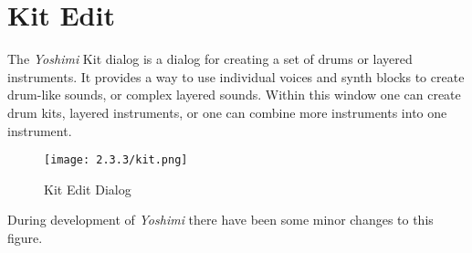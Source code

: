 %
%
%

\section{Kit Edit}
\label{sec:kit_edit}

   The \textsl{Yoshimi} Kit dialog is a dialog for creating a
   set of drums or layered instruments.
   It provides a way to use individual voices and synth blocks to create
   drum-like sounds, or complex layered sounds.
   Within this window one can create drum kits, layered instruments, or one
   can combine more instruments into one instrument.

\begin{figure}[H]
   \centering
   \texttt{[image: 2.3.3/kit.png]}
   \caption{Kit Edit Dialog}
   \label{fig:kit_edit_dialog}
\end{figure}

   During development of \textsl{Yoshimi} there have been some minor changes to
   this figure.

